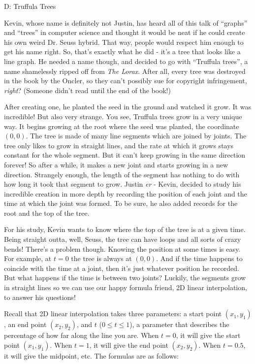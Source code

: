 \begin{problem}{D: Truffula Trees}

Kevin, whose name is definitely not Justin, has heard all of this talk of ``graphs'' and ``trees'' in computer science and thought it would be neat if he could create his own weird Dr. Seuss hybrid. That way, people would respect him enough to get his name right. So, that's exactly what he did - it's a tree that looks like a line graph. He needed a name though, and decided to go with ``Truffula trees'', a name shamelessly ripped off from \textit{The Lorax}. After all, every tree was destroyed in the book by the Oncler, so they can't possibly sue for copyright infringement, \textit{right}? (Someone didn't read until the end of the book!)

After creating one, he planted the seed in the ground and watched it grow. It was incredible! But also very strange. You see, Truffula trees grow in a very unique way. It begins growing at the root where the seed was planted, the coordinate $(0, 0)$. The tree is made of many line segments which are joined by joints. The tree only likes to grow in straight lines, and the rate at which it grows stays constant for the whole segment. But it can't keep growing in the same direction forever! So after a while, it makes a new joint and starts growing in a new direction. Strangely enough, the length of the segment has nothing to do with how long it took that segment to grow. Justin \textit{er} - Kevin, decided to study his incredible creation in more depth by recording the position of each joint and the time at which the joint was formed. To be sure, he also added records for the root and the top of the tree.

For his study, Kevin wants to know where the top of the tree is at a given time. Being straight outta, well, Seuss, the tree can have loops and all sorts of crazy bends! There's a problem though. Knowing the position at some times is easy. For example, at $t = 0$ the tree is always at $(0, 0)$. And if the time happens to coincide with the time at a joint, then it's just whatever position he recorded. But what happens if the time is between two joints? Luckily, the segments grow in straight lines so we can use our happy formula friend, 2D linear interpolation, to answer his questions!

Recall that 2D linear interpolation takes three parameters: a start point $(x_1, y_1)$, an end point $(x_2, y_2)$, and $t$ ($0 \leq t \leq 1$), a parameter that describes the percentage of how far along the line you are. When $t = 0$, it will give the start point $(x_1, y_1)$. When $t = 1$, it will give the end point $(x_2, y_2)$. When $t = 0.5$, it will give the midpoint, etc. The formulas are as follows:


\end{problem}
